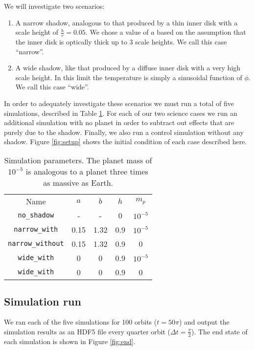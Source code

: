 \documentclass[twocolumn]{aastex631}
\begin{document}
We will investigate two scenarios:
\begin{enumerate}
    \item A narrow shadow, analogous to that produced by a thin inner disk with a scale height of $\frac{h}{r} = 0.05$. We chose a value of $a$ based on the assumption that the inner disk
        is optically thick up to 3 scale heights. We call this case ``narrow''.
    \item A wide shadow, like that produced by a diffuse inner disk with a very high scale height. In this limit the temperature is simply a sinusoidal function of $\phi$. We call this case ``wide''.
\end{enumerate}
In order to adequately investigate these scenarios we must run a total of five simulations, described in Table \ref{tab:scenarios}. For each of our two science cases we run an
additional simulation with no planet in order to subtract out effects that are purely due to the shadow. Finally, we also run a control simulation without any shadow.
Figure \ref{fig:setup} shows the initial condition of each case described here.


\begin{table}
    \label{tab:scenarios}
    \begin{tabular}{ccccc}
        \hline
        \hline
        Name & $a$ & $b$ & $h$ & $m_p$ \\
        \texttt{no\_shadow} & - & - & 0 & $10^{-5}$ \\
        \texttt{narrow\_with} & 0.15 & 1.32 & 0.9 & $10^{-5}$ \\
        \texttt{narrow\_without} & 0.15 & 1.32 & 0.9 & 0 \\
        \texttt{wide\_with} & 0 & 0 & 0.9 & $10^{-5}$ \\
        \texttt{wide\_with} & 0 & 0 & 0.9 & 0 \\
        \hline
    \end{tabular}
    \caption{Simulation parameters. The planet mass of $10^{-5}$ is analogous to a planet three times as massive as Earth.}
\end{table}

\subsection{Simulation run}
\label{subsec:sim_run}

We ran each of the five simulations for 100 orbits ($t = 50\pi$) and output the simulation results as an HDF5 file every
quarter orbit ($\Delta t = \frac{\pi}{2}$). The end state of each simulation is shown in Figure \ref{fig:end}.
\end{document}
